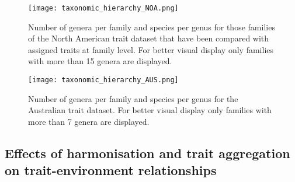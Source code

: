 \documentclass[../Draft_harmonization_paper.tex]{subfiles}
\begin{document}
\begin{figure}[H]
    \centering
    \texttt{[image: taxonomic\_hierarchy\_NOA.png]}
    \caption{Number of genera per family and species per genus for those families of the North American trait dataset that have been compared with assigned traits at family level. For better visual display only families with more than 15 genera are displayed.}
    \label{fig:tax_hierarchy_NOA}
\end{figure}

\begin{figure}[H]
    \centering
    \texttt{[image: taxonomic\_hierarchy\_AUS.png]}
    \caption{Number of genera per family and species per genus for the Australian trait dataset. For better visual display only families with more than 7 genera are displayed.}
    \label{fig:tax_hierarchy_AUS}
\end{figure}


\subsection*{Effects of harmonisation and trait aggregation on trait-environment relationships}
\end{document}
